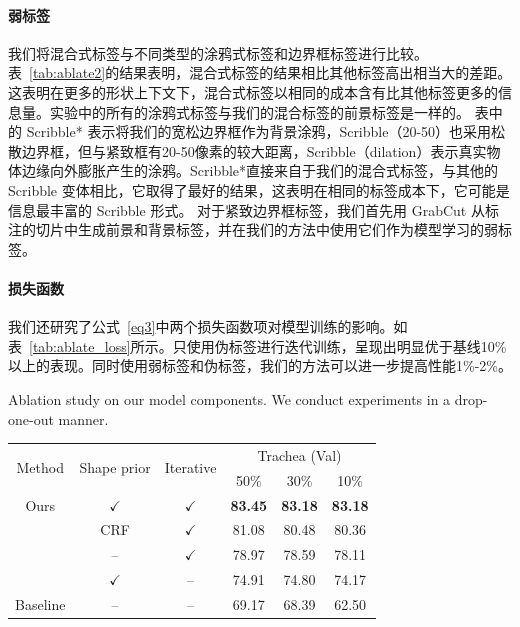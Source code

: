 \paragraph{弱标签}
我们将混合式标签与不同类型的涂鸦式标签和边界框标签进行比较。表~\ref{tab:ablate2}的结果表明，混合式标签的结果相比其他标签高出相当大的差距。这表明在更多的形状上下文下，混合式标签以相同的成本含有比其他标签更多的信息量。实验中的所有的涂鸦式标签与我们的混合标签的前景标签是一样的。
表中的 Scribble* 表示将我们的宽松边界框作为背景涂鸦，Scribble（20-50）也采用松散边界框，但与紧致框有20-50像素的较大距离，Scribble（dilation）表示真实物体边缘向外膨胀产生的涂鸦。Scribble*直接来自于我们的混合式标签，与其他的 Scribble 变体相比，它取得了最好的结果，这表明在相同的标签成本下，它可能是信息最丰富的 Scribble 形式。
对于紧致边界框标签，我们首先用 GrabCut 从标注的切片中生成前景和背景标签，并在我们的方法中使用它们作为模型学习的弱标签。
\paragraph{损失函数}
我们还研究了公式~\ref{eq3}中两个损失函数项对模型训练的影响。如表~\ref{tab:ablate_loss}所示。只使用伪标签进行迭代训练，呈现出明显优于基线10\%以上的表现。同时使用弱标签和伪标签，我们的方法可以进一步提高性能1\%-2\%。

\begin{table}[t!]
    \centering    
    {Ablation study on our model components. We conduct experiments in a drop-one-out manner.}
    \begin{tabular}[t]{c c c|c c c}
        \toprule
        \multirow{2}{*}{Method} & \multirow{2}{*}{Shape prior} & \multirow{2}{*}{Iterative}  & \multicolumn{3}{c}{Trachea (Val)} \\ %
        &                       &              & 50\% & 30\% & 10\%                 \\ \midrule
        Ours      & $\checkmark$  & $\checkmark$      & \textbf{83.45} & \textbf{83.18} & \textbf{83.18} \\ %
        & CRF      & $\checkmark$      & 81.08 & 80.48 & 80.36 \\
        & --            & $\checkmark$      & 78.97 & 78.59 & 78.11 \\ %
        & $\checkmark$  & --                & 74.91 & 74.80 & 74.17 \\
        Baseline      & --            & --                          & 69.17 & 68.39 & 62.50 \\
        \bottomrule 
    \end{tabular}
    \label{tab:ablate1}
\end{table}

